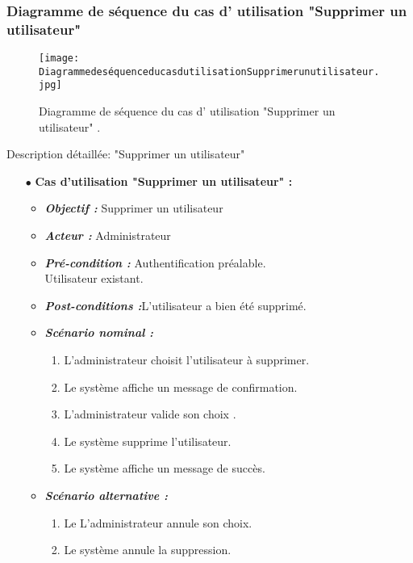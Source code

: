 \subsubsection{Diagramme de séquence du cas d' utilisation "Supprimer un utilisateur" }
\begin{figure}[ht]
	\centering
	\texttt{[image: DiagrammedeséquenceducasdutilisationSupprimerunutilisateur.jpg]}
	\caption{ Diagramme de séquence du cas d' utilisation "Supprimer un utilisateur"  .}
	\label{fig: Diagramme de séquence du cas d' utilisation Supprimer un utilisateur  }
\end{figure}
\FloatBarrier
\clearpage	
{\Large \color{cyan} Description détaillée: "Supprimer un utilisateur"}
\begin{itemize}
	\item[$\bullet$] \textbf{Cas d’utilisation "Supprimer un utilisateur" :} 
	\medskip
	\begin{itemize}
		\item \textit{\textbf{Objectif :}} Supprimer un utilisateur	
		\item \textit{\textbf{Acteur :}} Administrateur	
		\item \textit{\textbf{Pré-condition  :}} Authentification préalable.\\
		Utilisateur existant.
		\item \textit{\textbf{Post-conditions   :}}L’utilisateur a bien été supprimé.
		\item \textit{\textbf{Scénario nominal :}}
		\begin{enumerate}
			\item L’administrateur choisit l’utilisateur à supprimer. 
			\item Le système affiche un message de confirmation. 
			\item  L’administrateur valide son choix . 
			\item  Le système supprime l’utilisateur.  
			\item Le système affiche un message de succès.
		\end{enumerate}
		\item \textit{\textbf{Scénario alternative :}}
		\begin{enumerate}
			\item Le L’administrateur annule son choix.
			\item Le système annule la suppression.
		\end{enumerate}
	\end{itemize}
\end{itemize}
	

